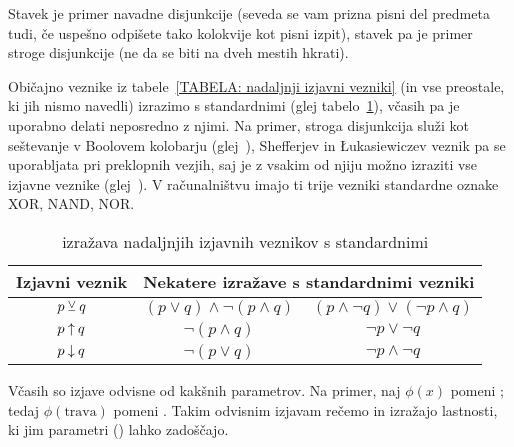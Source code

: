		\begin{zgled}
			Stavek  je primer navadne disjunkcije (seveda se vam prizna pisni del predmeta tudi, če uspešno odpišete tako kolokvije kot pisni izpit), stavek  pa je primer stroge disjunkcije (ne da se biti na dveh mestih hkrati).
		\end{zgled}
		
		Običajno veznike iz tabele~\ref{TABELA: nadaljnji izjavni vezniki} (in vse preostale, ki jih nismo navedli) izrazimo s standardnimi (glej tabelo~\ref{TABELA: izražava nadaljnjih izjavnih veznikov s standardnimi}), včasih pa je uporabno delati neposredno z njimi. Na primer, stroga disjunkcija služi kot seštevanje v Boolovem kolobarju (glej~), Shefferjev in Łukasiewiczev veznik pa se uporabljata pri preklopnih vezjih, saj je z vsakim od njiju možno izraziti vse izjavne veznike (glej~). V računalništvu imajo ti trije vezniki standardne oznake XOR, NAND, NOR.
		
		\begin{table}[!ht]
			\centering
			\begin{tabular}{|ccc|}
				\hline
				\textbf{Izjavni veznik} & \multicolumn{2}{c|}{\textbf{Nekatere izražave s standardnimi vezniki}} \\
				\hline
				$p \mathbin{\veebar} q$ & $(p \lor q) \land \lnot(p \land q)$ & $(p \land \lnot{q}) \lor (\lnot{p} \land q)$ \\
				$p \mathbin{\uparrow} q$ & $\lnot(p \land q)$ & $\lnot{p} \lor \lnot{q}$ \\
				$p \mathbin{\downarrow} q$ & $\lnot(p \lor q)$ & $\lnot{p} \land \lnot{q}$ \\
				\hline
			\end{tabular}
			\caption{izražava nadaljnjih izjavnih veznikov s standardnimi}\label{TABELA: izražava nadaljnjih izjavnih veznikov s standardnimi}
		\end{table}
		
		
		Včasih so izjave odvisne od kakšnih parametrov. Na primer, naj $\phi(x)$ pomeni ; tedaj $\phi(\text{trava})$ pomeni . Takim odvisnim izjavam rečemo  in izražajo lastnosti, ki jim parametri () lahko zadoščajo.
		

